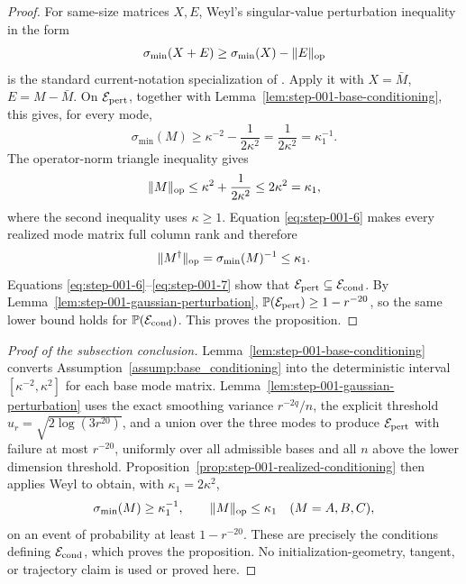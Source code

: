 \begin{proof}
For same-size matrices \(X,E\), Weyl's singular-value perturbation inequality
in the form
\[
  \sigma_{\min}(X+E)\ge \sigma_{\min}(X)-\|E\|_{\rm op}
\]
is the standard current-notation specialization of
\citet[Chapter~IV]{stewartSun1990}.  Apply it with
\(X=\bar M\), \(E=M-\bar M\).  On \(\mathcal E_{\rm pert}\), together with
Lemma~\ref{lem:step-001-base-conditioning}, this gives, for every mode,
\begin{equation}
  \sigma_{\min}(M)
  \ge\kappa^{-2}-\frac1{2\kappa^2}
  =\frac1{2\kappa^2}
  =\kappa_1^{-1}.                                           \label{eq:step-001-6}
\end{equation}
The operator-norm triangle inequality gives
\begin{equation}
  \|M\|_{\rm op}
  \le\kappa^2+\frac1{2\kappa^2}
  \le2\kappa^2
  =\kappa_1,                                                \label{eq:step-001-7}
\end{equation}
where the second inequality uses \(\kappa\ge1\). Equation \eqref{eq:step-001-6} makes every
realized mode matrix full column rank and therefore
\begin{equation}
  \|M^\dagger\|_{\rm op}
  =\sigma_{\min}(M)^{-1}
  \le\kappa_1.                                              \label{eq:step-001-8}
\end{equation}
Equations \eqref{eq:step-001-6}--\eqref{eq:step-001-7} show that
\(\mathcal E_{\rm pert}\subseteq\mathcal E_{\rm cond}\). By
Lemma~\ref{lem:step-001-gaussian-perturbation},
\(\mathbb P(\mathcal E_{\rm pert})\ge1-r^{-20}\), so the same lower bound
holds for \(\mathbb P(\mathcal E_{\rm cond})\). This proves the proposition.

\end{proof}

\begin{proof}[Proof of the subsection conclusion]

Lemma~\ref{lem:step-001-base-conditioning} converts
Assumption~\ref{assump:base_conditioning} into the deterministic interval
\([\kappa^{-2},\kappa^2]\) for each base mode matrix.
Lemma~\ref{lem:step-001-gaussian-perturbation} uses the exact smoothing
variance \(r^{-2q}/n\), the explicit threshold
\(u_r=\sqrt{2\log(3r^{20})}\), and a union over the three modes to produce
\(\mathcal E_{\rm pert}\) with failure at most \(r^{-20}\), uniformly over
all admissible bases and all \(n\) above the lower dimension threshold.
Proposition~\ref{prop:step-001-realized-conditioning} then applies Weyl to
obtain, with \(\kappa_1=2\kappa^2\),
\[
  \sigma_{\min}(M)\ge\kappa_1^{-1},\qquad
  \|M\|_{\rm op}\le\kappa_1
  \quad(M=A,B,C),
\]
on an event of probability at least \(1-r^{-20}\). These are precisely the
conditions defining \(\mathcal E_{\rm cond}\), which proves the proposition.
No initialization-geometry, tangent, or trajectory claim is used
or proved here.

\end{proof}

